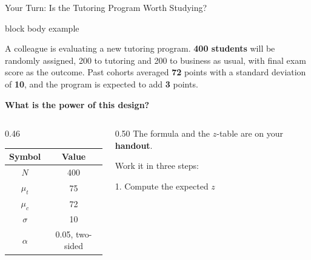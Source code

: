 \documentclass[
  ignorenonframetext,
  aspectratio=169,
]{beamer}
\newenvironment{notebox}{%
  \begin{center}%
  \begin{minipage}{0.95\textwidth}%
  \begin{beamercolorbox}[wd=\textwidth, sep=6pt]{block body example}%
}{%
  \end{beamercolorbox}%
  \end{minipage}%
  \end{center}%
}
\begin{document}
\begin{frame}{Your Turn: Is the Tutoring Program Worth Studying?}
\label{your-turn-is-the-tutoring-program-worth-studying}
\vspace{0.5em}

\begin{notebox}
\small A colleague is evaluating a new tutoring program. \textbf{400 students} will be randomly assigned, 200 to tutoring and 200 to business as usual, with final exam score as the outcome. Past cohorts averaged \textbf{72} points with a standard deviation of \textbf{10}, and the program is expected to add \textbf{3} points.
\end{notebox}

\vspace{0.7em}

\begin{center}
\large \textbf{What is the power of this design?}
\end{center}

\vspace{0.7em}

\begin{columns}[c]

\begin{column}{0.46\textwidth}
\begin{center}
\footnotesize
\setlength{\tabcolsep}{10pt}
\renewcommand{\arraystretch}{1.2}
\begin{tabular}{cc}
\toprule
\textbf{Symbol} & \textbf{Value} \\
\midrule
$N$      & 400  \\
$\mu_t$  & 75   \\
$\mu_c$  & 72   \\
$\sigma$ & 10   \\
$\alpha$ & 0.05, two-sided \\
\bottomrule
\end{tabular}
\end{center}
\end{column}

\begin{column}{0.50\textwidth}
\footnotesize
The formula and the $z$-table are on your \textbf{handout}.

\vspace{0.6em}

Work it in three steps:

\vspace{0.3em}

\hspace{0.4em}1. Compute the expected $z$


\end{column}
\end{columns}
\end{frame}
\end{document}
